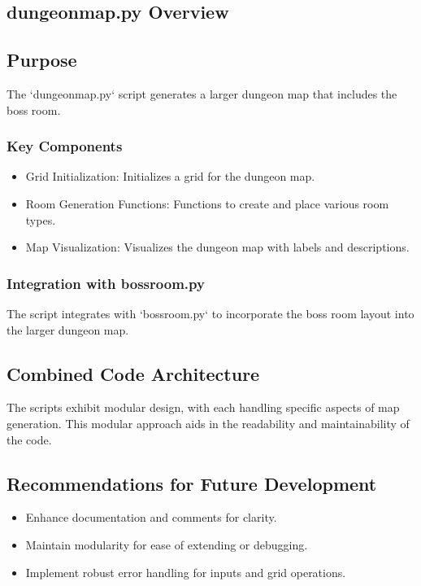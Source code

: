 \documentclass[10pt,twocolumn]{article}
\begin{document}
\subsection{dungeonmap.py Overview}
\subsection{Purpose}
The `dungeonmap.py` script generates a larger dungeon map that includes the boss room.

\subsubsection{Key Components}
\begin{itemize}
    \item Grid Initialization: Initializes a grid for the dungeon map.
    \item Room Generation Functions: Functions to create and place various room types.
    \item Map Visualization: Visualizes the dungeon map with labels and descriptions.
\end{itemize}

\subsubsection{Integration with bossroom.py}
The script integrates with `bossroom.py` to incorporate the boss room layout into the larger dungeon map.

\subsection{Combined Code Architecture}
The scripts exhibit modular design, with each handling specific aspects of map generation. This modular approach aids in the readability and maintainability of the code.

\subsection{Recommendations for Future Development}
\begin{itemize}
    \item Enhance documentation and comments for clarity.
    \item Maintain modularity for ease of extending or debugging.
    \item Implement robust error handling for inputs and grid operations.
\end{itemize}


\printbibliography
\end{document}
